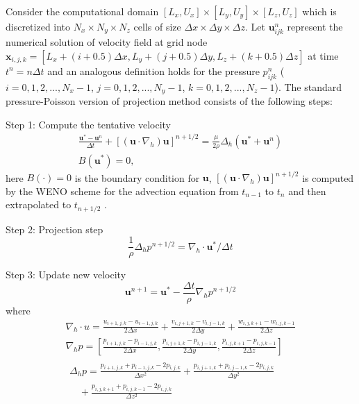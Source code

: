 Consider the computational domain $[L_x,U_x]\times[L_y,U_y]\times[L_z,U_z]$
which is discretized into $N_x\times N_y\times N_z$ cells of size $\Delta
x\times\Delta y\times\Delta z$. Let $\mathbf{u}^n_{ijk}$ represent the
numerical solution of velocity field at grid node  $\mathbf{x}_{i,j,k} =
[L_x+(i+0.5)\Delta x,L_y+(j+0.5)\Delta y, L_z+(k+0.5)\Delta z]$ at time $t^n =
n\Delta t$ and an analogous definition holds for the pressure $p^n_{ijk}$ ($i =
0,1,2,...,N_x-1$, $j = 0,1,2,...,N_y-1$, $k = 0,1,2,...,N_z-1$). The standard
pressure-Poisson version of projection method consists of the following steps:

Step 1: Compute the tentative velocity
\begin{eqnarray}
\frac{\mathbf{u}^*-\mathbf{u}^n}{\Delta t}+
[(\mathbf{u}\cdot\nabla_h)\mathbf{u}]^{n+1/2}
=\frac{\mu}{2\rho}\Delta_h(\mathbf{u}^*+\mathbf{u}^n)\\ B(\mathbf{u}^*) = 0,
\end{eqnarray} here $B(\cdot) = 0$ is the boundary condition for $\mathbf{u}$,
$[(\mathbf{u}\cdot\nabla_h)\mathbf{u}]^{n+1/2}$ is computed by the WENO scheme
\cite{Jiang1996Efficient} for the advection equation from $t_{n-1}$ to $t_{n}$ and then
extrapolated to $t_{n+1/2}$ \cite{Kim1985Application}.

Step 2: Projection step
\begin{equation} \frac{1}{\rho}\Delta_h p^{n+1/2} =
\nabla_h\cdot \mathbf{u}^*/\Delta t \label{proj} \end{equation}

Step 3: Update new velocity
\begin{equation} \mathbf{u}^{n+1} = \mathbf{u}^* -
\frac{\Delta t}{\rho}\nabla_h p^{n+1/2} \label{newvel} \end{equation}
where
\begin{eqnarray} \label{divU} \nabla_h\cdot u =
\frac{u_{i+1,j,k}-u_{i-1,j,k}}{2\Delta x} +
\frac{v_{i,j+1,k}-v_{i,j-1,k}}{2\Delta y} +
\frac{w_{i,j,k+1}-w_{i,j,k-1}}{2\Delta z}\\ \label{gradP} \nabla_h p =
[\frac{p_{i+1,j,k}-p_{i-1,j,k}}{2\Delta x},
\frac{p_{i,j+1,k}-p_{i,j-1,k}}{2\Delta y},
\frac{p_{i,j,k+1}-p_{i,j,k-1}}{2\Delta z}]\\    \label{lapP} 
\begin{aligned}
\Delta_h p = \frac{p_{i+1,j,k}+p_{i-1,j,k}-2p_{i,j,k}}{\Delta x^2} +
\frac{p_{i,j+1,k}+p_{i,j-1,k}-2p_{i,j,k}}{\Delta y^2} \\ \quad
+\frac{p_{i,j,k+1}+p_{i,j,k-1}-2p_{i,j,k}}{\Delta z^2} \end{aligned}
\end{eqnarray}


